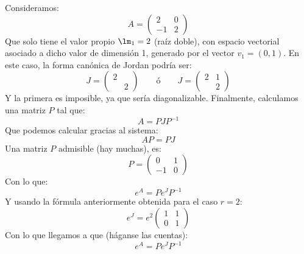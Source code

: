 \begin{ejemplo}
    Consideramos:
    \begin{equation*}
        A = \left(\begin{array}{cc}
                2 & 0 \\
                -1 & 2
        \end{array}\right)
    \end{equation*}
    Que solo tiene el valor propio $\lm_1=2$ (raíz doble), con espacio vectorial asociado a dicho valor de dimensión 1, generado por el vector $v_1=(0,1)$. En este caso, la forma canónica de Jordan podría ser:
    \begin{equation*}
        J = \left(\begin{array}{cc}
                2 & \\
                   & 2
        \end{array}\right) \qquad \text{ó} \qquad 
        J = \left(\begin{array}{cc}
                2 & 1\\
                   & 2
        \end{array}\right) 
    \end{equation*}
    Y la primera es imposible, ya que sería diagonalizable. Finalmente, calculamos una matriz $P$ tal que:
    \begin{equation*}
        A = P J P^{-1}
    \end{equation*}
    Que podemos calcular gracias al sistema:
    \begin{equation*}
        AP = PJ
    \end{equation*}
    Una matriz $P$ admisible (hay muchas), es:
    \begin{equation*}
        P = \left(\begin{array}{cc}
                0 & 1 \\
                -1 & 0
        \end{array}\right)
    \end{equation*}
    Con lo que:
    \begin{equation*}
        e^A = Pe^J P^{-1}
    \end{equation*}
    Y usando la fórmula anteriormente obtenida para el caso $r=2$:
    \begin{equation*}
        e^J = e^2 \left(\begin{array}{cc}
                1 & 1 \\
                0 & 1
        \end{array}\right)
    \end{equation*}
    Con lo que llegamos a que (háganse las cuentas):
    \begin{equation*}
        e^A = P e^J P^{-1}
    \end{equation*}
\end{ejemplo}

